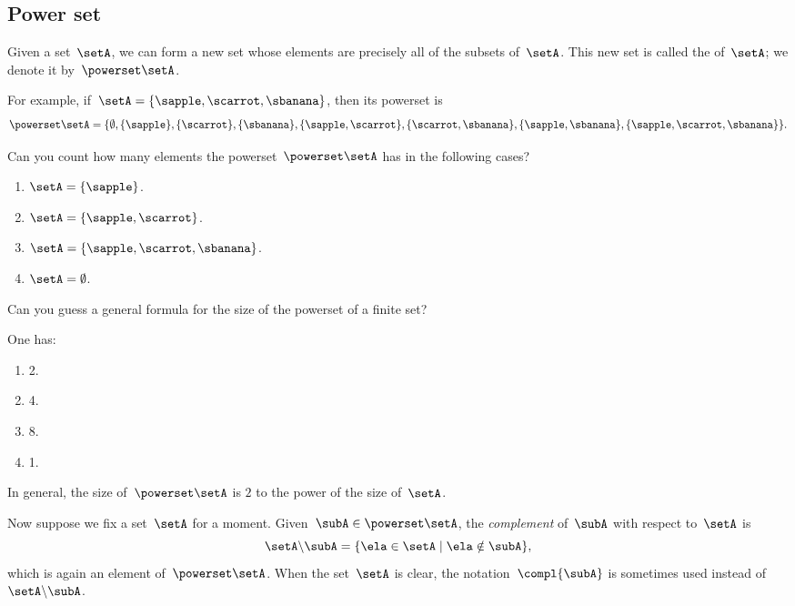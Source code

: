 \subsection{Power set}
\label{sec:power-set}

Given a set~$\setA$, we can form a new set whose elements are precisely all of the subsets of~$\setA$.
This new set is called the  of~$\setA$; we denote it by~$\powerset \setA$.

For example, if~$\setA = \{ \sapple, \scarrot, \sbanana \}$, then its powerset is
\begin{equation*}
    \powerset \setA = \{ \emptyset, \{ \sapple \}, \{ \scarrot \}, \{ \sbanana\}, \{ \sapple, \scarrot \}, \{ \scarrot, \sbanana \}, \{ \sapple, \sbanana\}, \{ \sapple, \scarrot, \sbanana \} \}.
\end{equation*}

\begin{exercise}
    Can you count how many elements the powerset~$\powerset \setA$ has in the following cases?
    \begin{enumerate}
        \item $\setA = \{ \sapple \} $.
        \item $\setA = \{ \sapple, \scarrot \} $.
        \item $\setA = \{ \sapple, \scarrot, \sbanana \} $.
        \item $\setA = \emptyset $.
    \end{enumerate}
    Can you guess a general formula for the size of the powerset of a finite set?
\end{exercise}

\begin{solution}
    One has:
    \begin{enumerate}
        \item 2.
        \item 4.
        \item 8.
        \item 1.
    \end{enumerate}
    In general, the size of~$\powerset \setA$ is $2$ to the power of the size of~$\setA$.
\end{solution}

Now suppose we fix a set~$\setA$ for a moment.
Given~$\subA \in \powerset \setA$, the \emph{complement} of~$\subA$ with respect to~$\setA$ is
\begin{equation*}
    \setA \backslash \subA = \{ \ela \in \setA \mid \ela \notin \subA \},
\end{equation*}
which is again an element of~$\powerset \setA$.
When the set~$\setA$ is clear, the notation~$\compl{\subA}$ is sometimes used instead of~$\setA \backslash \subA$.

